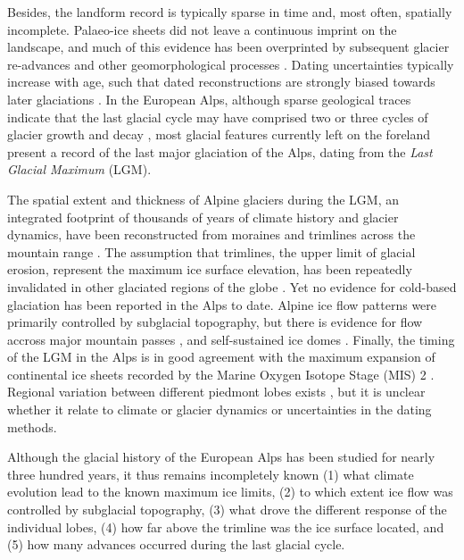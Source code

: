\documentclass[tc, manuscript]{copernicus}
\begin{document}
    Besides, the landform record is typically sparse in time and, most often,
    spatially incomplete. Palaeo-ice sheets did not leave a continuous imprint
    on the landscape, and much of this evidence has been overprinted by
    subsequent glacier re-advances and other geomorphological processes
    \citep[e.g.,][]{Kleman.1994, Kleman.etal.2006, Kleman.etal.2010}. Dating
    uncertainties typically increase with age, such that dated reconstructions
    are strongly biased towards later glaciations \citep{Heyman.etal.2011}.
    In the European Alps, although sparse
    geological traces indicate that the last glacial cycle may have comprised
    two or three cycles of glacier growth and decay \citep{Preusser.2004,
    Ivy-Ochs.etal.2008}, most glacial features currently left on the foreland
    present a record of the last major glaciation of the Alps, dating from the
    \emph{Last Glacial Maximum} (LGM).

    The spatial extent and thickness of Alpine glaciers during the LGM, an
    integrated footprint of thousands of years of climate history and glacier
    dynamics, have been reconstructed from moraines and trimlines across the
    mountain range \citep[e.g.,][]{Bini.etal.2009, Coutterand.2010,
    Husen.2011}. The assumption that trimlines, the upper limit of glacial
    erosion, represent the maximum ice surface elevation, has
    been repeatedly invalidated in other glaciated regions of the globe
    \citep[e.g.,][]{Kleman.1994, Kleman.etal.2010, Fabel.etal.2012}. Yet no
    evidence for cold-based glaciation has been reported in the Alps to date.
    Alpine ice flow
    patterns were primarily controlled by subglacial topography, but there is
    evidence for flow accross major mountain passes
    \citep[e.g.,][]{Coutterand.2010, Kelly.etal.2004, Husen.2011}, and
    self-sustained ice domes \citep{Bini.etal.2009}. Finally, the timing of the
    LGM in the Alps \citep{Ivy-Ochs.etal.2008, Monegato.etal.2017} is in good
    agreement with the maximum expansion of continental ice sheets recorded by
    the Marine Oxygen Isotope Stage (MIS) 2
    \citep[29--14\,ka;][]{Lisiecki.Raymo.2005}. Regional variation between
    different piedmont
    lobes exists \citep[Fig.~5]{Wirsig.etal.2016}, but it is unclear whether it
    relate to climate or glacier dynamics \citep{Monegato.etal.2017} or
    uncertainties in the dating methods.

    Although the glacial history of the European Alps has been studied for
    nearly three hundred years, it thus remains incompletely known
      (1) what climate evolution lead to the known maximum ice limits,
      (2) to which extent ice flow was controlled by subglacial topography,
      (3) what drove the different response of the individual lobes,
      (4) how far above the trimline was the ice surface located, and
      (5) how many advances occurred during the last glacial cycle.
\end{document}
